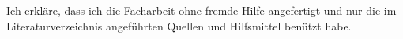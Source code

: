 \vspace{10cm}

Ich erkläre, dass ich die Facharbeit ohne fremde Hilfe angefertigt
und nur die im Literaturverzeichnis angeführten Quellen und
Hilfsmittel benützt habe.

\vspace{10cm}

